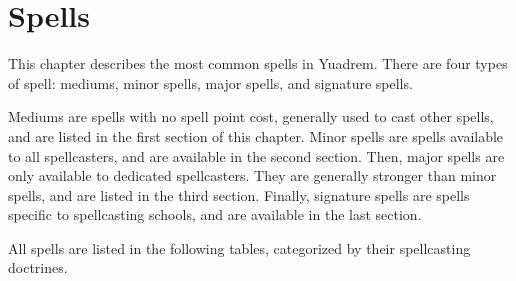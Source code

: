 \chapter{Spells}
This chapter describes the most common spells in Yuadrem.
There are four types of spell: mediums, minor spells, major spells, and signature spells.

Mediums are spells with no spell point cost, generally used to cast other spells, and are listed in the first section of this chapter.
Minor spells are spells available to all spellcasters, and are available in the second section.
Then, major spells are only available to dedicated spellcasters.
They are generally stronger than minor spells, and are listed in the third section.
Finally, signature spells are spells specific to spellcasting schools, and are available in the last section.

All spells are listed in the following tables, categorized by their spellcasting doctrines.




